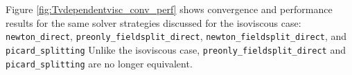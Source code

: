 Figure \ref{fig:Tvdependentvisc_conv_perf} shows convergence and performance results for the same solver strategies discussed for the
isoviscous case: \texttt{newton\_direct},
\texttt{preonly\_fieldsplit\_direct},
\texttt{newton\_fieldsplit\_direct}, and \texttt{picard\_splitting}
Unlike the isoviscous case, \texttt{preonly\_fieldsplit\_direct} and
\texttt{picard\_splitting} are no longer equivalent. 
